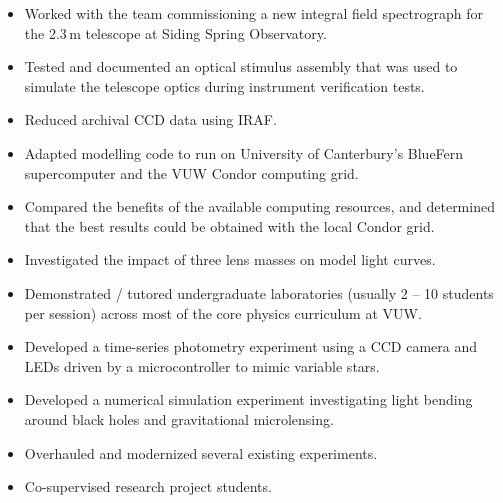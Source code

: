 \documentclass[print]{cv-style}
\begin{document}
\begin{entrylist}
  {
\begin{itemize}
    \item Worked with the team commissioning a new integral field spectrograph for the 2.3\,m telescope at Siding Spring Observatory.
    \item Tested and documented an optical stimulus assembly that was used to simulate the telescope optics during instrument verification tests.
    \item Reduced archival CCD data using IRAF.
  \end{itemize}}
  {
\begin{itemize}
    \item Adapted modelling code to run on University of Canterbury’s BlueFern supercomputer and the VUW Condor computing grid.
    \item Compared the benefits of the available computing resources, and determined that the best results could be obtained with the local Condor grid.
    \item Investigated the impact of three lens masses on model light curves.
  \end{itemize}}
  {
  \begin{itemize}
    \item Demonstrated / tutored undergraduate laboratories (usually 2 -- 10 students per session) across most of the core physics curriculum at VUW.
    \item Developed a time-series photometry experiment using a CCD camera and LEDs driven by a microcontroller to mimic variable stars.
    \item Developed a numerical simulation experiment investigating light bending around black holes and gravitational microlensing.
    \item Overhauled and modernized several existing experiments.
    \item Co-supervised research project students.

\end{itemize}}
\end{entrylist}
\end{document}
